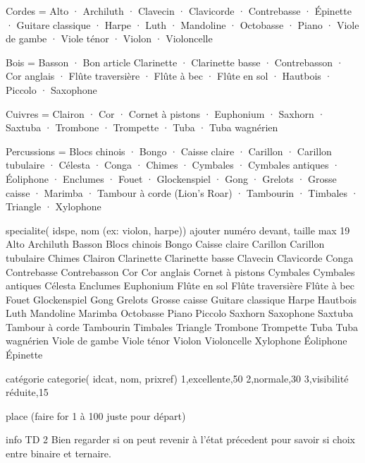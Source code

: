 \documentclass[12pt,a4paper]{article}
\begin{document}
{Cordes	= Alto · Archiluth · Clavecin · Clavicorde · Contrebasse · Épinette · Guitare classique · Harpe · Luth · Mandoline · Octobasse · Piano · Viole de gambe · Viole ténor · Violon · Violoncelle

Bois =  Basson · Bon article Clarinette · Clarinette basse · Contrebasson · Cor anglais · Flûte traversière · Flûte à bec · Flûte en sol · Hautbois · Piccolo · Saxophone

Cuivres	= Clairon · Cor · Cornet à pistons · Euphonium · Saxhorn · Saxtuba · Trombone · Trompette · Tuba · Tuba wagnérien

Percussions	= Blocs chinois · Bongo · Caisse claire · Carillon · Carillon tubulaire · Célesta · Conga · Chimes · Cymbales · Cymbales antiques · Éoliphone · Enclumes · Fouet · Glockenspiel · Gong · Grelots · Grosse caisse · Marimba · Tambour à corde (Lion's Roar) · Tambourin · Timbales · Triangle · Xylophone



specialite( idspe, nom (ex: violon, harpe)) ajouter numéro devant, taille max 19
Alto
Archiluth
Basson
Blocs chinois
Bongo
Caisse claire
Carillon
Carillon tubulaire
Chimes
Clairon
Clarinette
Clarinette basse
Clavecin
Clavicorde
Conga
Contrebasse
Contrebasson
Cor
Cor anglais
Cornet à pistons
Cymbales
Cymbales antiques
Célesta
Enclumes
Euphonium
Flûte en sol
Flûte traversière
Flûte à bec
Fouet
Glockenspiel
Gong
Grelots
Grosse caisse
Guitare classique
Harpe
Hautbois
Luth
Mandoline
Marimba
Octobasse
Piano
Piccolo
Saxhorn
Saxophone
Saxtuba
Tambour à corde
Tambourin
Timbales
Triangle
Trombone
Trompette
Tuba
Tuba wagnérien
Viole de gambe
Viole ténor
Violon
Violoncelle
Xylophone
Éoliphone
Épinette
﻿







catégorie
categorie( idcat, nom, prixref)
1,excellente,50
2,normale,30
3,visibilité réduite,15



place (faire for 1 à 100 juste pour départ)


















info TD 2
Bien regarder si on peut revenir à l'état précedent pour savoir si choix entre binaire et ternaire.


}
\end{document}
